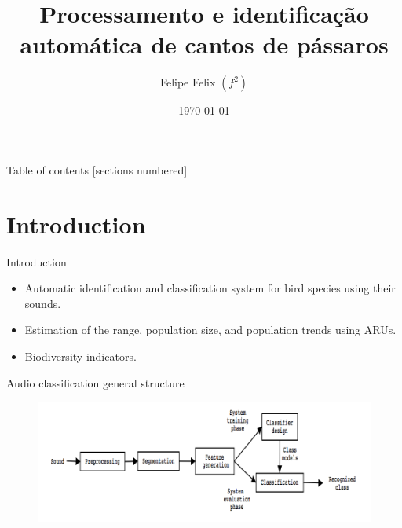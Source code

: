 \documentclass[10pt]{beamer}
\title{
Processamento e identificação automática de cantos de pássaros
}
\subtitle{}
\date{\today}
\author{Felipe Felix $(f^2)$}
\institute{IME-USP}
\begin{document}
\maketitle

\begin{frame}{Table of contents}
  [sections numbered]
  \tableofcontents[hideallsubsections]
\end{frame}

\section{Introduction}

\begin{frame}[fragile]{Introduction}
\begin{itemize}
\item Automatic identification and classification system for bird species using their sounds.
\item Estimation of the range, population size, 
and population trends using ARUs.
\item Biodiversity indicators.
\end{itemize}
\end{frame}

\begin{frame}[fragile]{Audio classification general structure}

\begin{figure}[h]
\includegraphics[width=1\textwidth]{estrutura}
\end{figure}


\end{frame}
\end{document}
